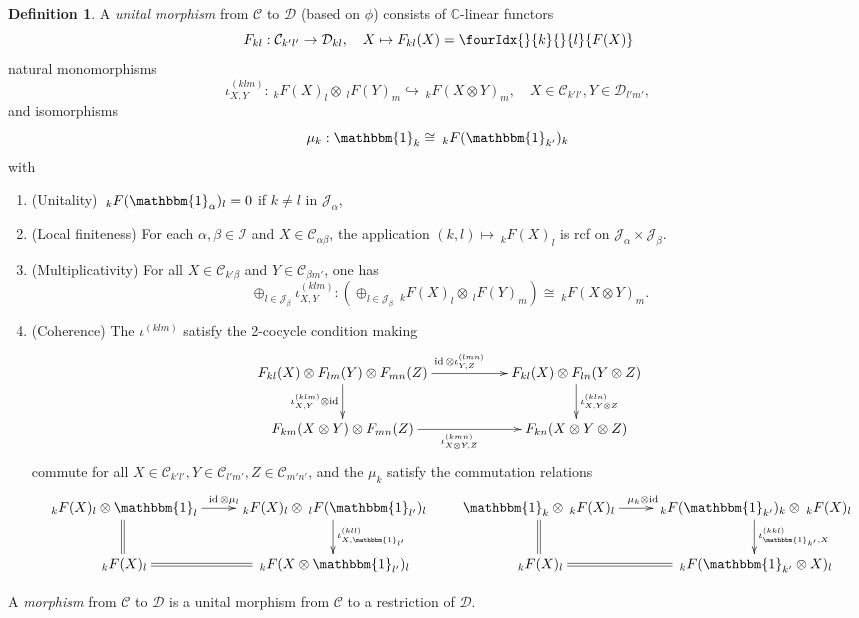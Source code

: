\documentclass[10pt]{article}
\DeclareMathOperator{\id}{id}
\newcommand{\C}{\mathbb{C}}
\newcommand{\CatC}{\mathcal{C}}
\newcommand{\CatD}{\mathcal{D}}
\newcommand{\CatCC}{\mathscr{C}}
\newcommand{\CatDD}{\mathscr{D}}
\newcommand{\GrDA}[3]{{}_{\;#2}#1_{#3}} %
\newcommand{\Unitb}{\mathbbm{1}}
\newcommand{\Gr}[5]{\fourIdx{#2}{#4}{#3}{#5}{#1}}%
\newcommand{\Gru}[3]{\Gr{#1}{}{}{#2}{#3}}
\theoremstyle{definition}
\newtheorem{Def}[Theorem]{Definition}
\numberwithin{equation}{section}
\begin{document}
\begin{Def}
A \emph{unital morphism} from $\CatCC$ to $\CatDD$ (based on $\phi$) consists of $\C$-linear functors \[F_{kl}: \CatC_{k'l'}\rightarrow \CatD_{kl},\quad X\mapsto F_{kl}(X) = \Gru{F(X)}{k}{l}\] natural monomorphisms \[\iota^{(klm)}_{X,Y}: \GrDA{F(X)}{k}{l} \otimes \GrDA{F(Y)}{l}{m} \hookrightarrow \GrDA{F(X\otimes Y)}{k}{m}, \quad X\in \CatC_{k'l'},Y\in \CatD_{l'm'},\] and isomorphisms \[\mu_{k}:  \Unitb_k \cong \GrDA{F(\Unitb_{k'})}{k}{k}\] with \begin{enumerate}[label=(\arabic*)]
\item (Unitality)  $\GrDA{F(\Unitb_{\alpha})}{k}{l}= 0$ if $k\neq l$ in $\mathscr{J}_\alpha$,
\item (Local finiteness) For each $\alpha,\beta\in \mathscr{I}$ and $X\in \CatC_{\alpha\beta}$, the application $(k,l)\mapsto \GrDA{F(X)}{k}{l}$ is rcf on $\mathscr{J}_{\alpha}\times \mathscr{J}_{\beta}$. 
\item (Multiplicativity) For all $X\in \CatC_{k'\beta}$ and $Y\in \CatC_{\beta m'}$, one has\[\oplus_{l\in \mathscr{J}_\beta} \iota^{(klm)}_{X,Y}: \left(\oplus_{l\in \mathscr{J}_\beta} \GrDA{F(X)}{k}{l} \otimes \GrDA{F(Y)}{l}{m}\right) \cong \GrDA{F(X\otimes Y)}{k}{m}.\]
\item (Coherence) The $\iota^{(klm)}$ satisfy the 2-cocycle condition making \[\xymatrix{F_{kl}(X)\otimes F_{lm}(Y)\otimes F_{mn}(Z) \ar[rr]^{\id\otimes \iota^{(lmn)}_{Y,Z}} \ar[d]_{\iota^{(klm)}_{X,Y}\otimes\id}&& F_{kl}(X)\otimes F_{ln}(Y\otimes Z)\ar[d]^{\iota^{(kln)}_{X,Y\otimes Z}}\\ F_{km}(X\otimes Y)\otimes F_{mn}(Z) \ar[rr]_{\iota^{(kmn)}_{X\otimes Y,Z}}&& F_{kn}(X\otimes Y \otimes Z)}\] commute for all $X\in \CatC_{k'l'},Y\in \CatC_{l'm'}, Z\in \CatC_{m'n'}$, and the $\mu_k$ satisfy the commutation relations \[\xymatrix{ \GrDA{F(X)}{k}{l}\otimes \Unitb_l \ar[r]^{\!\!\!\!\id\otimes \mu_l} \ar@{=}[d] & \GrDA{F(X)}{k}{l} \otimes \GrDA{F(\Unitb_{l'})}{l}{l} \ar[d]^{\iota^{(kll)}_{X, \Unitb_{l'}}} \\ \GrDA{F(X)}{k}{l} & \ar@{=}[l] \GrDA{F(X\otimes \Unitb_{l'})}{k}{l}} \qquad \xymatrix{  \Unitb_k\otimes \GrDA{F(X)}{k}{l}\ar[r]^{\!\!\!\!\mu_k\otimes \id} \ar@{=}[d] & \GrDA{F(\Unitb_{k'})}{k}{k} \otimes \GrDA{F(X)}{k}{l} \ar[d]^{\iota^{(kkl)}_{\Unitb_{k'},X}} \\ \GrDA{F(X)}{k}{l} & \ar@{=}[l] \GrDA{ F(\Unitb_{k'}\otimes X)}{k}{l}} \]
\end{enumerate}

A \emph{morphism} from $\CatCC$ to $\CatDD$ is a unital morphism from $\CatCC$ to a restriction of $\CatDD$. 
\end{Def}
\end{document}
